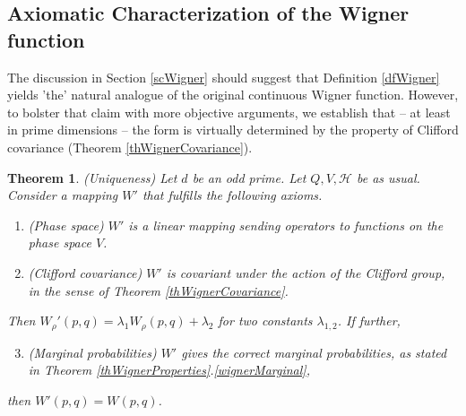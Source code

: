 \documentclass[aps,twocolumn,floatfix]{revtex4}
\newtheorem{theorem}{Theorem}
\def\H{\mathcal{H}}
\begin{document}
\subsection{Axiomatic Characterization of the Wigner function}
\label{scUniqueness}

The discussion in Section \ref{scWigner} should suggest that
Definition \ref{dfWigner} yields 'the' natural analogue of the
original continuous Wigner function. However, to bolster that claim
with more objective arguments, we establish that -- at least in prime
dimensions -- the form is virtually determined by the property of
Clifford covariance (Theorem \ref{thWignerCovariance}). 

\begin{theorem}
	\emph{(Uniqueness)}
	Let $d$ be an odd prime. Let $Q,V,\H$ be as usual.  Consider a mapping $W'$
	that fulfills the following axioms.
	\begin{enumerate}
		\item \emph{(Phase space)}
		$W'$ is a linear mapping sending operators to functions on
		the phase space $V$.

		\item
		\emph{(Clifford covariance)}
		$W'$ is covariant under the action of the Clifford group, in the
		sense of Theorem \ref{thWignerCovariance}.
	\end{enumerate}
	Then
		$W_\rho'(p,q) = \lambda_1 W_\rho(p,q) + \lambda_2$
	for two constants $\lambda_{1,2}$.  If further, 
	\begin{enumerate}
		\setcounter{enumi}{2}
		\item \emph{(Marginal probabilities)}
		$W'$ gives the correct marginal probabilities, as stated in 
		Theorem \ref{thWignerProperties}.\ref{wignerMarginal},
	\end{enumerate}
	then $W'(p,q)=W(p,q)$.
\end{theorem}
\end{document}
